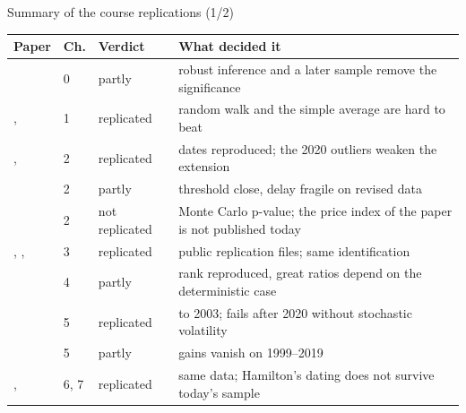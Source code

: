\begin{frame}{Summary of the course replications (1/2)}
\itemsize{\small}
\begin{center}
\scriptsize
\begin{tabular}{>{\raggedright\arraybackslash}p{4.3cm}l>{\raggedright\arraybackslash}p{1.7cm}>{\raggedright\arraybackslash}p{6.2cm}}
\toprule
\textbf{Paper} & \textbf{Ch.} & \textbf{Verdict} & \textbf{What decided it} \\
\midrule
{}{} & 0 & partly & robust inference and a later sample remove the significance \\
, {} & 1 & replicated & random walk and the simple average are hard to beat \\
, {} & 2 & replicated & dates reproduced; the 2020 outliers weaken the extension \\
{} & 2 & partly & threshold close, delay fragile on revised data \\
{} & 2 & not replicated & Monte Carlo p-value; the price index of the paper is not published today \\
, , {} & 3 & replicated & public replication files; same identification \\
{} & 4 & partly & rank reproduced, great ratios depend on the deterministic case \\
{} & 5 & replicated & to 2003; fails after 2020 without stochastic volatility \\
{} & 5 & partly & gains vanish on 1999--2019 \\
, {} & 6, 7 & replicated & same data; Hamilton's dating does not survive today's sample \\
\bottomrule
\end{tabular}
\end{center}
\end{frame}

